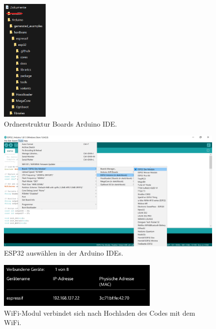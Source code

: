\begin{figure}[H]
	\centering
	\includegraphics[width=0.2\textwidth]{graphics/ESP32_Ordner}
	\caption{Ordnerstruktur Boards Arduino IDE.}
	\label{fig:ESP32_Ordner}
\end{figure}

\begin{figure}[H]
	\centering
	\includegraphics[width=\textwidth]{graphics/ESP32_Arduino_IDE}
	\caption{ESP32 auswählen in der Arduino IDEs.}
	\label{fig:ESP32_Arduino_IDE}
\end{figure}

\begin{figure}[H]
	\centering
	\includegraphics[width=0.7\textwidth]{graphics/ESP32_Verbundene_Geraete}
	\caption{WiFi-Modul verbindet sich nach Hochladen des Codes mit dem WiFi.}
	\label{fig:ESP32_Verbundene_Geraete}
\end{figure}

